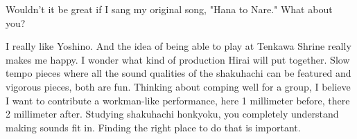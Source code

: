 \begin{drama}
\par
\par

Wouldn't it be great if I sang my original song, "Hana to Nare." What about you?

\par
\par

 I really like Yoshino. And the idea of being able to play at Tenkawa Shrine really makes me happy. I wonder what kind of production Hirai will put together. Slow tempo pieces where all the sound qualities of the shakuhachi can be featured and vigorous pieces, both are fun. Thinking about comping well for a group, I believe I want to contribute a workman-like performance, here 1 millimeter before, there 2 millimeter after. Studying shakuhachi honkyoku, you completely understand making sounds fit in. Finding the right place to do that is important.

\end{drama}

